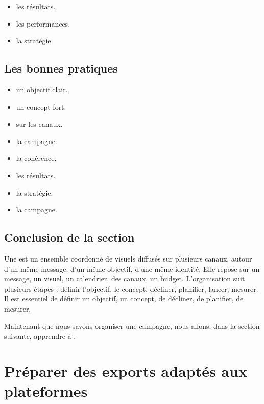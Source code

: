 \begin{itemize}
    \item {} les résultats.
    \item {} les performances.
    \item {} la stratégie.
\end{itemize}

\subsection{Les bonnes pratiques}

\begin{itemize}
    \item {} un objectif clair.
    \item {} un concept fort.
    \item {} sur les canaux.
    \item {} la campagne.
    \item {} la cohérence.
    \item {} les résultats.
    \item {} la stratégie.
    \item {} la campagne.
\end{itemize}

\subsection*{Conclusion de la section}

Une  est un ensemble coordonné de visuels diffusés sur plusieurs canaux, autour d'un même message, d'un même objectif, d'une même identité. Elle repose sur un message, un visuel, un calendrier, des canaux, un budget. L'organisation suit plusieurs étapes : définir l'objectif, le concept, décliner, planifier, lancer, mesurer. Il est essentiel de définir un objectif, un concept, de décliner, de planifier, de mesurer.

Maintenant que nous savons organiser une campagne, nous allons, dans la section suivante, apprendre à .

\section{Préparer des exports adaptés aux plateformes}

